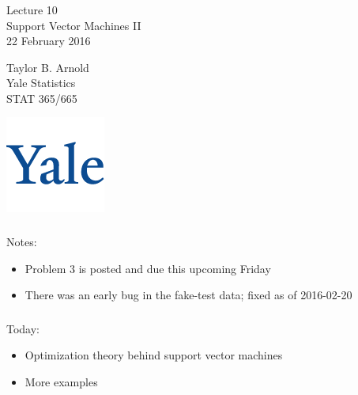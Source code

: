 \documentclass[xetex,mathserif,serif,aspectratio=169]{beamer}
\begin{document}
\begin{frame}[fragile] \frametitle{} \oldB \small

\vfill

{\fontsize{0.7cm}{0cm}\selectfont Lecture 10 \\\vspace{0.2cm} Support Vector Machines II}\\\vspace{0.5cm}
22 February 2016

\vspace{2cm}

\begin{minipage}{0.6\textwidth}
Taylor B. Arnold \\
Yale Statistics \\
STAT 365/665
\end{minipage}
\hfill
\begin{minipage}{0.3\textwidth}\raggedleft
\includegraphics[scale=0.3]{../yale-logo.png}
\end{minipage}%

\end{frame}

\begin{frame}[fragile] \frametitle{} \oldB \small

Notes:
\begin{itemize}
\item Problem 3 is posted and due this upcoming Friday
\item There was an early bug in the fake-test data; fixed as of 2016-02-20
\end{itemize}

\end{frame}

\begin{frame}[fragile] \frametitle{} \oldB \small

Today:
\begin{itemize}
\item Optimization theory behind support vector machines
\item More examples
\end{itemize}

\end{frame}
\end{document}
